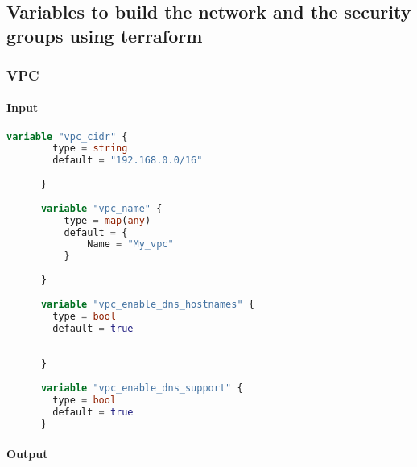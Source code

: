 
\chapter{}%
\label{ch:Bijlagen}

\section{
{Variables to build the network and the security groups using terraform}}
\label{sec:Variabelen voor het bouwen van het netwerk en de security groups met terraform}

\subsection{
{VPC}}
\label{sec:VPC}

\subsubsection{
{Input}}

\begin{lstlisting}[language=terraform]
    variable "vpc_cidr" {
        type = string
        default = "192.168.0.0/16"
        
      }
      
      variable "vpc_name" {
          type = map(any)
          default = {
              Name = "My_vpc"
          }
        
      }
      
      variable "vpc_enable_dns_hostnames" {
        type = bool
        default = true
      
        
      }
      
      variable "vpc_enable_dns_support" {
        type = bool
        default = true
      } 
\end{lstlisting}

\subsubsection{
{Output}}

